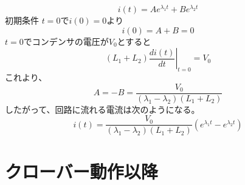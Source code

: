 \documentclass[book,openany]{jlreq}
\theoremstyle{definition}
\begin{document}
%
\begin{equation}
  i(t) = A e^{\lambda_1 t} + B e^{\lambda_2 t}
\end{equation}
%
初期条件 $t=0$で$i(0)=0$より
%
\begin{equation}
  i(0) = A + B = 0
\end{equation}
%
$t=0$でコンデンサの電圧が$V_0$とすると
%
\begin{equation}
  (L_1+L_2)\left. \frac{di(t)}{dt} \right|_{t=0}= V_0
\end{equation}
%
これより、
%
\begin{equation}
  A = -B = \frac{V_0}{(\lambda_1 - \lambda_2)(L_1+L_2)}
\end{equation}
%
したがって、回路に流れる電流は次のようになる。
%
\begin{equation}
  i(t) = \frac{V_0}{(\lambda_1 - \lambda_2)(L_1+L_2)} \left(e^{\lambda_1 t} - e^{\lambda_2 t}\right)
\end{equation}

\section{クローバー動作以降}
\end{document}

